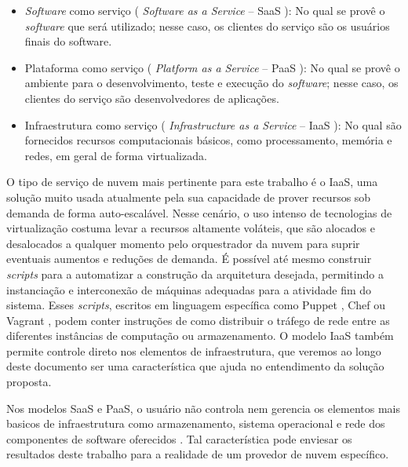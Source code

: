 \begin{itemize}
	\item \textit{Software} como serviço ( \textit{Software as a Service} -- SaaS ): No qual se provê o \textit{software} que será utilizado; nesse caso, os clientes do serviço são os usuários finais do software.
	
	\item Plataforma como serviço ( \textit{Platform as a Service} -- PaaS ): No qual se provê o ambiente para o desenvolvimento, teste e execução do \textit{software}; nesse caso, os clientes do serviço são desenvolvedores de aplicações.
	
	\item Infraestrutura como serviço ( \textit{Infrastructure as a Service} -- IaaS ): No qual são fornecidos recursos computacionais básicos, como processamento, memória e redes, em geral de forma virtualizada.
\end{itemize}

O tipo de serviço de nuvem mais pertinente para este trabalho é o IaaS, uma solução muito usada atualmente pela sua capacidade de prover recursos sob demanda de forma auto-escalável.
%
Nesse cenário, o uso intenso de tecnologias de virtualização costuma levar a recursos altamente voláteis, que são alocados e desalocados a qualquer momento pelo orquestrador da nuvem para suprir eventuais aumentos e reduções de demanda.
%
É possível até mesmo construir \textit{scripts} para a automatizar a construção da arquitetura desejada, permitindo a instanciação e interconexão de máquinas adequadas para a atividade fim do sistema.
%
Esses \textit{scripts}, escritos em linguagem específica como Puppet \cite{Puppet2018}, Chef \cite{Chef2018} ou Vagrant \cite{Vagrant2018}, podem conter instruções de como distribuir o tráfego de rede entre as diferentes instâncias de computação ou armazenamento.
%
O modelo IaaS também permite controle direto nos elementos de infraestrutura, que veremos ao longo deste documento ser uma característica que ajuda no entendimento da solução proposta.
%

Nos modelos SaaS e PaaS, o usuário não controla nem gerencia os elementos mais basicos de infraestrutura como armazenamento, sistema operacional e rede dos componentes de software oferecidos \cite{NIST2011}. Tal característica pode enviesar os resultados deste trabalho para a realidade de um provedor de nuvem específico.


